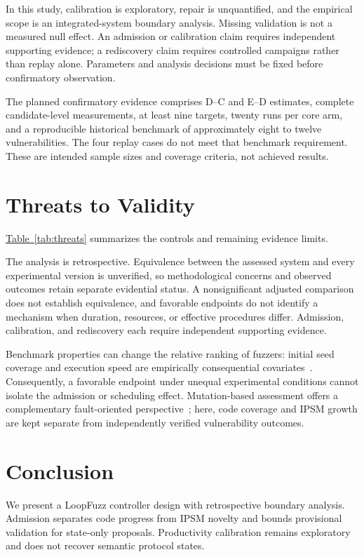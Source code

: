 \documentclass[final,5p,times,number]{elsarticle}
\newcommand{\namedref}[2]{\hyperref[#2]{#1~\ref*{#2}}}
\begin{document}
In this study, calibration is exploratory, repair is unquantified, and the empirical scope is an integrated-system boundary analysis. Missing validation is not a measured null effect. An admission or calibration claim requires independent supporting evidence; a rediscovery claim requires controlled campaigns rather than replay alone. Parameters and analysis decisions must be fixed before confirmatory observation.

The planned confirmatory evidence comprises D--C and E--D estimates, complete candidate-level measurements, at least nine targets, twenty runs per core arm, and a reproducible historical benchmark of approximately eight to twelve vulnerabilities. The four replay cases do not meet that benchmark requirement. These are intended sample sizes and coverage criteria, not achieved results.

\section{Threats to Validity}
\namedref{Table}{tab:threats} summarizes the controls and remaining evidence limits.
\label{sec:threats}


The analysis is retrospective. Equivalence between the assessed system and every experimental version is unverified, so methodological concerns and observed outcomes retain separate evidential status. A nonsignificant adjusted comparison does not establish equivalence, and favorable endpoints do not identify a mechanism when duration, resources, or effective procedures differ. Admission, calibration, and rediscovery each require independent supporting evidence.

Benchmark properties can change the relative ranking of fuzzers: initial seed coverage and execution speed are empirically consequential covariates~\cite{benchmarkproperties}. Consequently, a favorable endpoint under unequal experimental conditions cannot isolate the admission or scheduling effect. Mutation-based assessment offers a complementary fault-oriented perspective~\cite{mutationassessment2023}; here, code coverage and IPSM growth are kept separate from independently verified vulnerability outcomes.

\section{Conclusion}
We present a LoopFuzz controller design with retrospective boundary analysis. Admission separates code progress from IPSM novelty and bounds provisional validation for state-only proposals. Productivity calibration remains exploratory and does not recover semantic protocol states.
\end{document}
